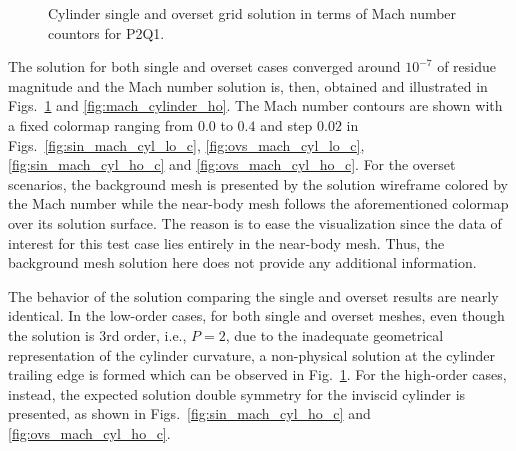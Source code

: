 \begin{figure}[H]
{		\label{fig:ovs_mach_cyl_lo_c}
    }
    \caption{Cylinder single and overset grid solution in terms of Mach number countors for P2Q1.}
    \label{fig:mach_cylinder_lo}
\end{figure}

The solution for both single and overset cases converged around $10^{-7}$ of residue magnitude and the Mach number solution is, then, obtained and illustrated in Figs.\ \ref{fig:mach_cylinder_lo} and \ref{fig:mach_cylinder_ho}. The Mach number contours are shown with a fixed colormap ranging from $0.0$ to $0.4$ and step $0.02$ in Figs.\ \ref{fig:sin_mach_cyl_lo_c}, \ref{fig:ovs_mach_cyl_lo_c}, \ref{fig:sin_mach_cyl_ho_c} and \ref{fig:ovs_mach_cyl_ho_c}. For the overset scenarios, the background mesh is presented by the solution wireframe colored by the Mach number while the near-body mesh follows the aforementioned colormap over its solution surface. The reason is to ease the visualization since the data of interest for this test case lies entirely in the near-body mesh. Thus, the background mesh solution here does not provide any additional information. 

The behavior of the solution comparing the single and overset results are nearly identical. In the low-order cases, for both single and overset meshes, even though the solution is 3rd order, i.e., $P=2$, due to the inadequate geometrical representation of the cylinder curvature, a non-physical solution at the cylinder trailing edge is formed which can be observed in Fig.\ \ref{fig:mach_cylinder_lo}. For the high-order cases, instead, the expected solution double symmetry for the inviscid cylinder is presented, as shown in Figs.\ \ref{fig:sin_mach_cyl_ho_c} and \ref{fig:ovs_mach_cyl_ho_c}.

